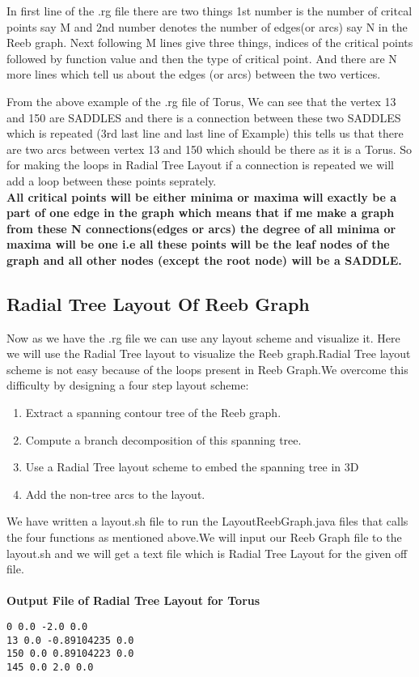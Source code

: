 \documentclass[a4paper]{article}
\begin{document}
\begin{multicols}{2}
\begin{lstlisting}
\end{lstlisting}



In first line of the .rg file there are two things 1st number is the number of critcal points say M and 2nd number denotes the number of edges(or arcs) say N in the Reeb graph. Next following M lines give three things, indices of the critical points followed by function value and then the type of critical point. And there are N more lines which tell us about the edges (or arcs) between the two vertices.

From the above example of the .rg file of Torus, We can see that the vertex 13 and 150 are SADDLES and there is a connection between these two SADDLES which is repeated (3rd last line and last line of Example) this tells us that there are two arcs between vertex 13 and 150 which should be there as it is a Torus. So for making the loops in Radial Tree Layout if a connection is repeated we will add a loop between these points seprately.\\
\newline
\textbf{
All critical points will be either minima or maxima will exactly be a part of one edge in the graph which means that if me make a graph from these N connections(edges or arcs) the degree of all minima or maxima will be one i.e all these points will be the leaf nodes of the graph and all other nodes (except the root node) will be a SADDLE.
}
\subsection{Radial Tree Layout Of Reeb Graph}
Now as we have the .rg file we can use any layout scheme and visualize it. Here we will use the Radial Tree layout to visualize the Reeb graph.Radial Tree layout scheme is not easy because of the loops present in Reeb Graph.We overcome this difficulty
by designing a four step layout scheme:
\begin{enumerate}
    \item Extract a spanning contour tree of the Reeb graph.
    \item Compute a branch decomposition of this spanning
tree.
    \item Use a Radial Tree layout scheme to embed the spanning
tree in 3D
    \item Add the non-tree arcs to the layout.
    
\end{enumerate}
We have written a layout.sh file to run the LayoutReebGraph.java files that calls the four functions as mentioned above.We will input our Reeb Graph file to the layout.sh and we will get a text file which is Radial Tree Layout for the given off file.\\\\
\textbf{Output File of Radial Tree Layout for Torus}\\
\begin{lstlisting}
0 0.0 -2.0 0.0
13 0.0 -0.89104235 0.0
150 0.0 0.89104223 0.0
145 0.0 2.0 0.0
\end{lstlisting}


\end{multicols}
\end{document}
